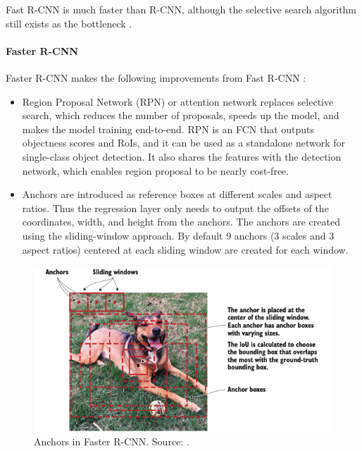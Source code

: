 \documentclass[a4paper, 11pt, oneside]{article}
\begin{document}
Fast R-CNN is much faster than R-CNN, although the selective search algorithm still exists as the bottleneck
\cite{elgendy2020deep, girshick2015fast, ren2015faster}.

\paragraph{Faster R-CNN}

Faster R-CNN makes the following improvements from Fast R-CNN \cite{elgendy2020deep, ren2015faster}:

\begin{itemize}
  \item Region Proposal Network (RPN) or attention network replaces selective search, which reduces the number of
  proposals, speeds up the model, and makes the model training end-to-end. RPN is an FCN that outputs objectness scores
  and RoIs, and it can be used as a standalone network for single-class object detection. It also shares the features
  with the detection network, which enables region proposal to be nearly cost-free.
  \item Anchors are introduced as reference boxes at different scales and aspect ratios. Thus the regression layer
  only needs to output the offsets of the coordinates, width, and height from the anchors. The anchors are created using
  the sliding-window approach. By default 9 anchors (3 scales and 3 aspect ratios) centered at each sliding window are
  created for each window.
\end{itemize}

\begin{figure}[ht]
  \begin{center}
    \includegraphics[width=.8\textwidth]{anchors.png}
  \end{center}
  \caption{Anchors in Faster R-CNN. Source: \cite{elgendy2020deep}.}
\end{figure}
\end{document}
